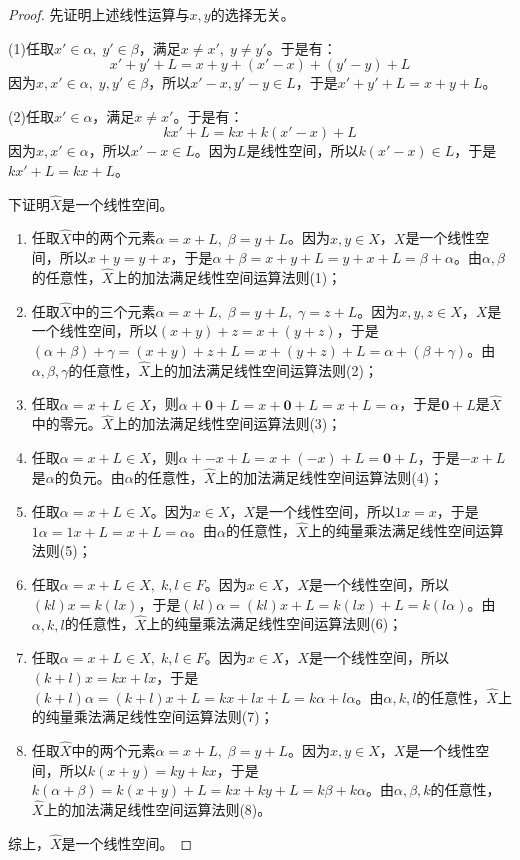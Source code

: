 \begin{proof}
	先证明上述线性运算与$x,y$的选择无关。\par
	(1)任取$x'\in\alpha,\;y'\in\beta$，满足$x\ne x',\;y\ne y'$。于是有：
	\begin{equation*}
		x'+y'+L=x+y+(x'-x)+(y'-y)+L
	\end{equation*}
	因为$x,x'\in\alpha,\;y,y'\in\beta$，所以$x'-x,y'-y\in L$，于是$x'+y'+L=x+y+L$。\par
	(2)任取$x'\in\alpha$，满足$x\ne x'$。于是有：
	\begin{equation*}
		kx'+L=kx+k(x'-x)+L
	\end{equation*}
	因为$x,x'\in\alpha$，所以$x'-x\in L$。因为$L$是线性空间，所以$k(x'-x)\in L$，于是$kx'+L=kx+L$。\par
	下证明$\hat{X}$是一个线性空间。\par
	\begin{enumerate}
		\item 任取$\hat{X}$中的两个元素$\alpha=x+L,\;\beta=y+L$。因为$x,y\in X$，$X$是一个线性空间，所以$x+y=y+x$，于是$\alpha+\beta=x+y+L=y+x+L=\beta+\alpha$。由$\alpha,\beta$的任意性，$\hat{X}$上的加法满足线性空间运算法则(1)；
		\item 任取$\hat{X}$中的三个元素$\alpha=x+L,\;\beta=y+L,\;\gamma=z+L$。因为$x,y,z\in X$，$X$是一个线性空间，所以$(x+y)+z=x+(y+z)$，于是$(\alpha+\beta)+\gamma=(x+y)+z+L=x+(y+z)+L=\alpha+(\beta+\gamma)$。由$\alpha,\beta,\gamma$的任意性，$\hat{X}$上的加法满足线性空间运算法则(2)；
		\item 任取$\alpha=x+L\in\hat{X}$，则$\alpha+\mathbf{0}+L=x+\mathbf{0}+L=x+L=\alpha$，于是$\mathbf{0}+L$是$\hat{X}$中的零元。$\hat{X}$上的加法满足线性空间运算法则(3)；
		\item 任取$\alpha=x+L\in\hat{X}$，则$\alpha+-x+L=x+(-x)+L=\mathbf{0}+L$，于是$-x+L$是$\alpha$的负元。由$\alpha$的任意性，$\hat{X}$上的加法满足线性空间运算法则(4)；
		\item 任取$\alpha=x+L\in\hat{X}$。因为$x\in X$，$X$是一个线性空间，所以$1x=x$，于是$1\alpha=1x+L=x+L=\alpha$。由$\alpha$的任意性，$\hat{X}$上的纯量乘法满足线性空间运算法则(5)；
		\item 任取$\alpha=x+L\in\hat{X},\;k,l\in F$。因为$x\in X$，$X$是一个线性空间，所以$(kl)x=k(lx)$，于是$(kl)\alpha=(kl)x+L=k(lx)+L=k(l\alpha)$。由$\alpha,k,l$的任意性，$\hat{X}$上的纯量乘法满足线性空间运算法则(6)；
		\item 任取$\alpha=x+L\in\hat{X},\;k,l\in F$。因为$x\in X$，$X$是一个线性空间，所以$(k+l)x=kx+lx$，于是$(k+l)\alpha=(k+l)x+L=kx+lx+L=k\alpha+l\alpha$。由$\alpha,k,l$的任意性，$\hat{X}$上的纯量乘法满足线性空间运算法则(7)；
		\item 任取$\hat{X}$中的两个元素$\alpha=x+L,\;\beta=y+L$。因为$x,y\in X$，$X$是一个线性空间，所以$k(x+y)=ky+kx$，于是$k(\alpha+\beta)=k(x+y)+L=kx+ky+L=k\beta+k\alpha$。由$\alpha,\beta,k$的任意性，$\hat{X}$上的加法满足线性空间运算法则(8)。
	\end{enumerate}
	综上，$\hat{X}$是一个线性空间。
\end{proof}
